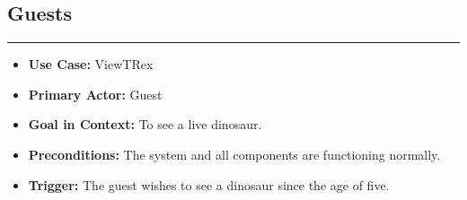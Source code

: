 \documentclass[12pt]{article}
\begin{document}
\subsection{Guests}
    \par\noindent\rule{\textwidth}{0.4pt}    
    \begin{itemize}
        \item[]\textbf{Use Case:}                                
            ViewTRex

        \item[]\textbf{Primary Actor:}
            Guest

        \item[]\textbf{Goal in Context:}
            To see a live dinosaur.

        \item[]\textbf{Preconditions:}
            The system and all components are functioning normally.
            
        \item[]\textbf{Trigger:}
            The guest wishes to see a dinosaur since the age of five.


\end{itemize}
\end{document}
